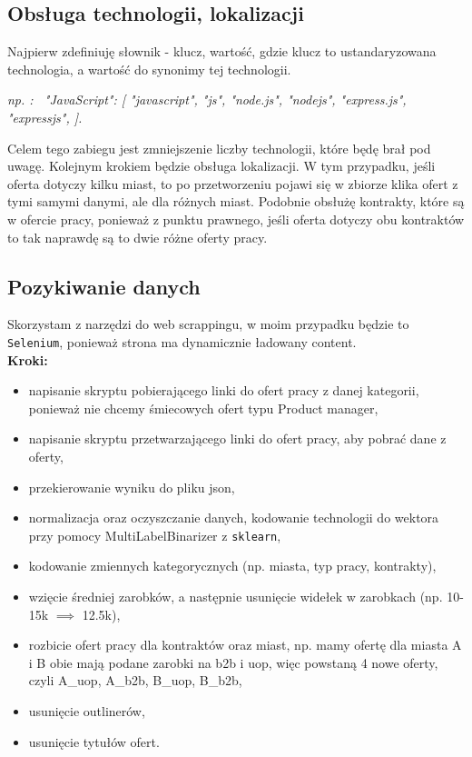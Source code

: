 \documentclass[a4paper]{article}
\begin{document}
\subsection{Obsługa technologii, lokalizacji}

\quad Najpierw zdefiniuję słownik - klucz, wartość, gdzie klucz to ustandaryzowana technologia, a wartość do synonimy tej technologii.

\textit{np. : \ "JavaScript": [
"javascript",
"js",
"node.js",
"nodejs",
"express.js",
"expressjs",
].}

\quad Celem tego zabiegu jest zmniejszenie liczby technologii, które będę brał pod uwagę. Kolejnym
krokiem będzie obsługa lokalizacji. W tym przypadku, jeśli oferta dotyczy kilku miast, to po przetworzeniu pojawi się w zbiorze
klika ofert z tymi samymi danymi, ale dla różnych miast. Podobnie obsłużę kontrakty, które są w ofercie pracy, ponieważ z punktu
prawnego, jeśli oferta dotyczy obu kontraktów to tak naprawdę są to dwie różne oferty pracy.


\subsection{Pozykiwanie danych}

\quad Skorzystam z narzędzi do web scrappingu, w moim przypadku będzie
to \texttt{Selenium}, ponieważ strona ma dynamicznie ładowany content.\\


\textbf{Kroki:}

\begin{itemize}
    \item napisanie skryptu pobierającego linki do ofert pracy z danej kategorii, ponieważ nie chcemy śmiecowych ofert typu Product manager,
    \item napisanie skryptu przetwarzającego linki do ofert pracy, aby pobrać dane z oferty,
    \item przekierowanie wyniku do pliku json,
    \item normalizacja oraz oczyszczanie danych, kodowanie technologii do wektora przy pomocy MultiLabelBinarizer z \texttt{sklearn},
    \item kodowanie zmiennych kategorycznych (np. miasta, typ pracy, kontrakty),
    \item wzięcie średniej zarobków, a następnie usunięcie widełek w zarobkach (np. 10-15k $\implies$ 12.5k),
    \item rozbicie ofert pracy dla kontraktów oraz miast, np. mamy ofertę dla miasta A i B obie mają podane
          zarobki na b2b i uop, więc powstaną 4 nowe oferty, czyli A\_uop, A\_b2b, B\_uop, B\_b2b,
    \item usunięcie outlinerów,
    \item usunięcie tytułów ofert.
\end{itemize}
\end{document}
